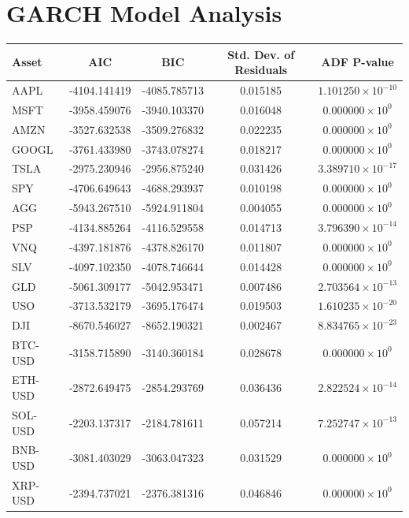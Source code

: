 \pagebreak
\setcounter{section}{1}
\section{GARCH Model Analysis}\label{appendix:garch_comparison}

\begin{table}[h]
\centering
\begin{tabular}{|l|c|c|c|c|}
\hline
\textbf{Asset} & \textbf{AIC} & \textbf{BIC} & \textbf{Std. Dev. of Residuals} & \textbf{ADF P-value} \\
\hline
AAPL & -4104.141419 & -4085.785713 & 0.015185 & $1.101250 \times 10^{-10}$ \\
MSFT & -3958.459076 & -3940.103370 & 0.016048 & $0.000000 \times 10^{0}$ \\
AMZN & -3527.632538 & -3509.276832 & 0.022235 & $0.000000 \times 10^{0}$ \\
GOOGL & -3761.433980 & -3743.078274 & 0.018217 & $0.000000 \times 10^{0}$ \\
TSLA & -2975.230946 & -2956.875240 & 0.031426 & $3.389710 \times 10^{-17}$ \\
SPY & -4706.649643 & -4688.293937 & 0.010198 & $0.000000 \times 10^{0}$ \\
AGG & -5943.267510 & -5924.911804 & 0.004055 & $0.000000 \times 10^{0}$ \\
PSP & -4134.885264 & -4116.529558 & 0.014713 & $3.796390 \times 10^{-14}$ \\
VNQ & -4397.181876 & -4378.826170 & 0.011807 & $0.000000 \times 10^{0}$ \\
SLV & -4097.102350 & -4078.746644 & 0.014428 & $0.000000 \times 10^{0}$ \\
GLD & -5061.309177 & -5042.953471 & 0.007486 & $2.703564 \times 10^{-13}$ \\
USO & -3713.532179 & -3695.176474 & 0.019503 & $1.610235 \times 10^{-20}$ \\
DJI & -8670.546027 & -8652.190321 & 0.002467 & $8.834765 \times 10^{-23}$ \\
BTC-USD & -3158.715890 & -3140.360184 & 0.028678 & $0.000000 \times 10^{0}$ \\
ETH-USD & -2872.649475 & -2854.293769 & 0.036436 & $2.822524 \times 10^{-14}$ \\
SOL-USD & -2203.137317 & -2184.781611 & 0.057214 & $7.252747 \times 10^{-13}$ \\
BNB-USD & -3081.403029 & -3063.047323 & 0.031529 & $0.000000 \times 10^{0}$ \\
XRP-USD & -2394.737021 & -2376.381316 & 0.046846 & $0.000000 \times 10^{0}$ \\

\end{tabular}
\end{table}

